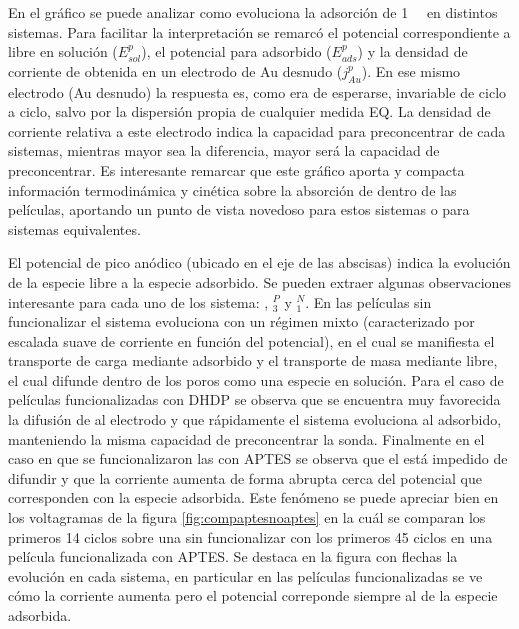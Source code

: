 	 	 En el gráfico se puede analizar como evoluciona la adsorción de \ru\space \SI{1}{\milli\Molar} en distintos sistemas. Para facilitar la interpretación se remarcó el potencial correspondiente a \ru\space libre en solución ($E^p_{sol}$), el potencial para \ru\space adsorbido ($E^p_{ads}$) y la densidad de corriente de \ru\space obtenida en un electrodo de Au desnudo ($j^p_{Au}$). En ese mismo electrodo (Au desnudo) la respuesta es, como era de esperarse, invariable de ciclo a ciclo, salvo por la dispersión propia de cualquier medida EQ. La densidad de corriente relativa a este electrodo indica la capacidad para preconcentrar de cada sistemas, mientras mayor sea la diferencia, mayor será la capacidad de preconcentrar. Es interesante remarcar que este gráfico aporta y compacta información termodinámica y cinética sobre la absorción de \ru\space dentro de las películas, aportando un punto de vista novedoso para estos sistemas o para sistemas equivalentes.

	  	 El potencial de pico anódico (ubicado en el eje de las abscisas) indica la evolución de la especie \ru\space libre a la especie \ru\space adsorbido. Se pueden extraer algunas observaciones interesante para cada uno de los sistema: \pdmZ, \pdmZ$^P_3$ y \pdmZ$^N_1$. En las películas sin funcionalizar el sistema evoluciona con un régimen mixto (caracterizado por escalada suave de corriente en función del potencial), en el cual se manifiesta el transporte de carga mediante \ru\space adsorbido y el transporte de masa mediante \ru\space libre, el cual difunde dentro de los poros como una especie en solución. Para el caso de películas funcionalizadas con DHDP se observa que se encuentra muy favorecida la difusión de \ru\space al electrodo y que rápidamente el sistema evoluciona al adsorbido, manteniendo la misma capacidad de preconcentrar la sonda. Finalmente en el caso en que se funcionalizaron las \pdmZ\space con APTES se observa que el \ru\space está impedido de difundir y que la corriente aumenta de forma abrupta cerca del potencial que corresponden con la especie \ru\space adsorbida. Este fenómeno se puede apreciar bien en los voltagramas de la figura \ref{fig:compaptesnoaptes} en la cuál se comparan los primeros 14 ciclos sobre una \pdmZ\space sin funcionalizar con los primeros 45 ciclos en una película funcionalizada con APTES. Se destaca en la figura con flechas la evolución en cada sistema, en particular en las películas funcionalizadas se ve cómo la corriente aumenta pero el potencial correponde siempre al de la especie adsorbida.

